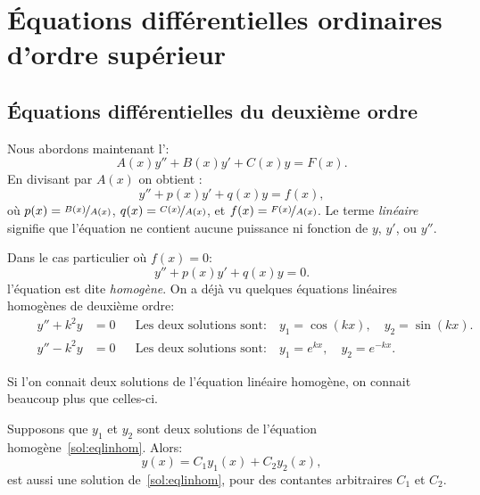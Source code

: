 \chapter{Équations différentielles ordinaires d'ordre supérieur} \label{ho:chapter}


\section{Équations différentielles du deuxième ordre}
\label{solinear:section}


Nous abordons maintenant l'\emph{}:
\begin{equation*}
A(x) y'' + B(x)y' + C(x)y = F(x) .
\end{equation*}
En divisant par $A(x)$ on obtient : 
\begin{equation} \label{sol:eqlin}
y'' + p(x)y' + q(x)y = f(x) ,
\end{equation}
où $p(x) = \nicefrac{B(x)}{A(x)}$, $q(x) = \nicefrac{C(x)}{A(x)}$, et
$f(x) = \nicefrac{F(x)}{A(x)}$.
Le terme \emph{linéaire} signifie que l'équation ne contient aucune puissance ni fonction de $y$, $y'$, ou $y''$.

Dans le cas particulier où $f(x) = 0$:
%
\begin{equation} \label{sol:eqlinhom}
y'' + p(x)y' + q(x)y = 0 .
\end{equation}
l'équation est dite 
\emph{homogène}.  On a déjà vu quelques équations linéaires homogènes de deuxième ordre:
\begin{align*}
\qquad y'' + k^2 y & = 0 &
& \text{Les deux solutions sont:} \quad y_1 = \cos (kx), \quad y_2 = \sin(kx) . \qquad \\
\qquad y'' - k^2 y & = 0 &
& \text{Les deux solutions sont:} \quad y_1 = e^{kx}, \quad y_2 = e^{-kx} . \qquad
\end{align*}

Si l'on connait deux solutions de l'équation linéaire homogène, on connait beaucoup plus que celles-ci.

\begin{theorem}[Superposition]
Supposons que $y_1$ et $y_2$ sont deux solutions de l'équation homogène~\eqref{sol:eqlinhom}.  Alors:
\begin{equation*}
y(x) = C_1 y_1(x) + C_2 y_2(x) ,
\end{equation*}
est aussi une solution de~\eqref{sol:eqlinhom}, pour des contantes arbitraires $C_1$ et $C_2$.
\end{theorem}

